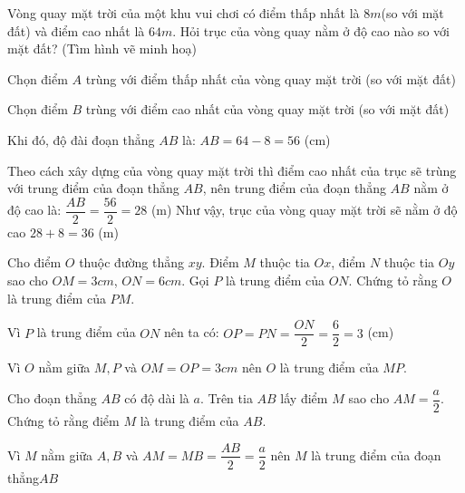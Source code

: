 \begin{bt}
	Vòng quay mặt trời của một khu vui chơi có điểm thấp nhất là $8m$(so với mặt đất) và điểm cao nhất là $64m$. Hỏi trục của vòng quay nằm ở độ cao nào so với mặt đất? (Tìm hình vẽ minh hoạ)
	\begin{loigiaichuong29}
		Chọn điểm $A$  trùng với điểm thấp nhất của vòng quay mặt trời (so với mặt đất)
		
		Chọn điểm $B$  trùng với điểm cao nhất của vòng quay mặt trời (so với mặt đất)
		
		Khi đó, độ đài đoạn thẳng  $AB$ là: $AB = 64-8 = 56$ (cm)
		
		Theo cách xây dựng của vòng quay mặt trời thì điểm cao nhất của trục sẽ trùng với trung điểm của đoạn thẳng  $AB$, nên trung điểm của đoạn thẳng $AB$ nằm ở độ cao là: $\dfrac{AB}{2} = \dfrac{56}{2} = 28$ (m) 
		Như vậy, trục của vòng quay mặt trời sẽ nằm ở độ cao $28 + 8 = 36$ (m) 
	\end{loigiaichuong29}
\end{bt}
\begin{bt}
	Cho điểm $O$ thuộc đường thẳng $xy$. Điểm $M$ thuộc tia $Ox$, điểm $N$ thuộc tia $Oy$ sao cho $OM=3cm$, $ON=6cm$. Gọi $P$ là trung điểm của $ON$. Chứng tỏ rằng $O$ là trung điểm của $PM$.
	\begin{loigiaichuong29}
		Vì $P$ là trung điểm của $ON$ nên ta có: $OP = PN = \dfrac{ON}{2} = \dfrac{6}{2} = 3$ (cm)
		
		Vì $O$ nằm giữa $M,P$ và $OM=OP=3cm$ nên $O$ là trung điểm của $MP$.
	\end{loigiaichuong29}
	\begin{center}
	\end{center}
\end{bt}
\begin{bt}
	Cho đoạn thẳng $AB$ có độ dài là $a$. Trên tia $AB$ lấy điểm $M$ sao cho $AM=\dfrac{a}{2}$. Chứng tỏ rằng điểm $M$ là trung điểm của $AB$.
	\begin{loigiaichuong29}
		Vì $M$ nằm giữa $A,B$ và $AM=MB=\dfrac{AB}{2}=\dfrac{a}{2}$ nên $M$ là trung điểm của đoạn thẳng$AB$
		\begin{center}
		\end{center}
	\end{loigiaichuong29}
\end{bt}
